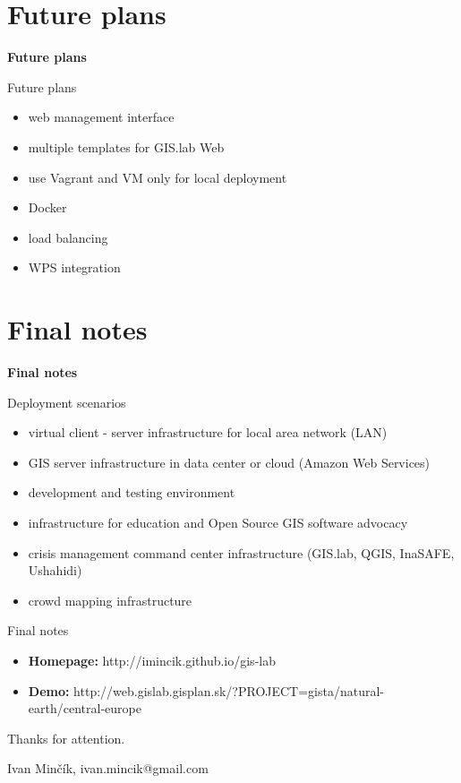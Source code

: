 \documentclass[12pt]{beamer}
\begin{document}
\section{Future plans}
\begin{frame}
	\begin{center}
		\LARGE\textbf{Future plans}
	\end{center}
\end{frame}


\begin{frame}{Future plans}
	\begin{itemize}
		\item web management interface
		\item multiple templates for GIS.lab Web
		\item use Vagrant and VM only for local deployment
		\item Docker
		\item load balancing
		\item WPS integration
	\end{itemize}
\end{frame}


\section{Final notes}
\begin{frame}
	\begin{center}
		\LARGE\textbf{Final notes}
	\end{center}
\end{frame}


\begin{frame}{Deployment scenarios}
	\begin{itemize}
		\item virtual client - server infrastructure for local area network (LAN)
		\item GIS server infrastructure in data center or cloud (Amazon Web Services)
		\item development and testing environment
		\item infrastructure for education and Open Source GIS software advocacy
		\item crisis management command center infrastructure (GIS.lab, QGIS, InaSAFE, Ushahidi)
		\item crowd mapping infrastructure
	\end{itemize}
\end{frame}


\begin{frame}{Final notes}
	\begin{itemize}
		\item \textbf{Homepage:} http://imincik.github.io/gis-lab
		\item \textbf{Demo:} http://web.gislab.gisplan.sk/?PROJECT=gista/natural-earth/central-europe
	\end{itemize}
	
	\bigskip
	Thanks for attention.
	
	Ivan Minčík, ivan.mincik@gmail.com
\end{frame}


\end{document}
